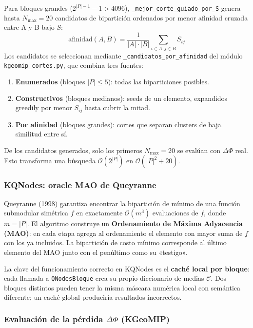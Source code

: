 Para bloques grandes ($2^{|P|-1} - 1 > 4096$), \texttt{\_mejor\_corte\_guiado\_por\_S}
genera hasta $N_{\max} = 20$ candidatos de bipartición ordenados por menor afinidad
cruzada entre A y B bajo $S$:
\begin{equation}
  \text{afinidad}(A, B) = \frac{1}{|A| \cdot |B|} \sum_{i \in A, j \in B} S_{ij}
\end{equation}
Los candidatos se seleccionan mediante \texttt{\_candidatos\_por\_afinidad} del módulo
\texttt{kgeomip\_cortes.py}, que combina tres fuentes:
\begin{enumerate}
  \item \textbf{Enumerados} (bloques $|P| \leq 5$): todas las biparticiones posibles.
  \item \textbf{Constructivos} (bloques medianos): seeds de un elemento, expandidos
        greedily por menor $S_{ij}$ hasta cubrir la mitad.
  \item \textbf{Por afinidad} (bloques grandes): cortes que separan clusters de baja
        similitud entre sí.
\end{enumerate}
De los candidatos generados, solo los primeros $N_{\max} = 20$ se evalúan con $\Delta\Phi$
real. Esto transforma una búsqueda $\mathcal{O}(2^{|P|})$ en $\mathcal{O}(|P|^2 + 20)$.

\subsubsection*{KQNodes: oracle MAO de Queyranne}

Queyranne (1998) garantiza encontrar la bipartición de mínimo de una función
submodular simétrica $f$ en exactamente $\mathcal{O}(m^3)$ evaluaciones de $f$,
donde $m = |P|$. El algoritmo construye un \textbf{Ordenamiento de Máxima Adyacencia
(MAO)}: en cada etapa agrega al ordenamiento el elemento con mayor suma de $f$ con
los ya incluidos. La bipartición de costo mínimo corresponde al último elemento del
MAO junto con el penúltimo como su «testigo».

La clave del funcionamiento correcto en KQNodes es el \textbf{caché local por bloque}:
cada llamada a \texttt{QNodesBloque} crea su propio diccionario de medias
$\mathcal{C}$. Dos bloques distintos pueden tener la misma máscara numérica local
con semántica diferente; un caché global produciría resultados incorrectos.

\subsubsection*{Evaluación de la pérdida $\Delta\Phi$ (KGeoMIP)}

